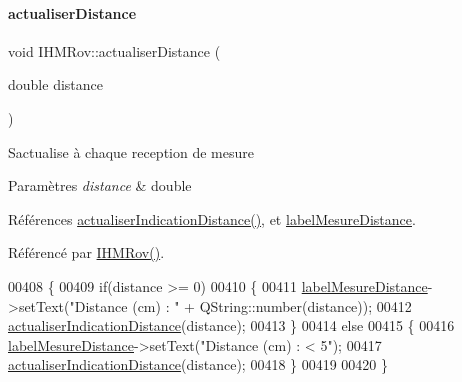 \mbox{\label{class_i_h_m_rov_a891d51cf532d9cc8fc56c63a0c61e663}} 
\paragraph{\texorpdfstring{actualiser\+Distance}{actualiserDistance}}
{\footnotesize\ttfamily void I\+H\+M\+Rov\+::actualiser\+Distance (\begin{DoxyParamCaption}\item[{double}]{distance }\end{DoxyParamCaption})\hspace{0.3cm}{\ttfamily [slot]}}

S\textquotesingle{}actualise à chaque reception de mesure


\begin{DoxyParams}{Paramètres}
{\em distance} & double \\
\hline
\end{DoxyParams}


Références \hyperlink{class_i_h_m_rov_a7e55a10ef08b8a771fa692ec1d150d33}{actualiser\+Indication\+Distance()}, et \hyperlink{class_i_h_m_rov_a39ff04b1880aa20941716cf7a6e1b8d8}{label\+Mesure\+Distance}.



Référencé par \hyperlink{class_i_h_m_rov_a5dac1fb4612866cc61f699a415e0ef6b}{I\+H\+M\+Rov()}.


\begin{DoxyCode}
00408 \{
00409     \textcolor{keywordflow}{if}(distance >= 0)
00410     \{
00411         \hyperlink{class_i_h_m_rov_a39ff04b1880aa20941716cf7a6e1b8d8}{labelMesureDistance}->setText(\textcolor{stringliteral}{"Distance (cm) : "} + QString::number(distance));
00412         \hyperlink{class_i_h_m_rov_a7e55a10ef08b8a771fa692ec1d150d33}{actualiserIndicationDistance}(distance);
00413     \}
00414     \textcolor{keywordflow}{else}
00415     \{
00416         \hyperlink{class_i_h_m_rov_a39ff04b1880aa20941716cf7a6e1b8d8}{labelMesureDistance}->setText(\textcolor{stringliteral}{"Distance (cm) : < 5"});
00417         \hyperlink{class_i_h_m_rov_a7e55a10ef08b8a771fa692ec1d150d33}{actualiserIndicationDistance}(distance);
00418     \}
00419 
00420 \}
\end{DoxyCode}
\mbox{\label{class_i_h_m_rov_a7e55a10ef08b8a771fa692ec1d150d33}} 
